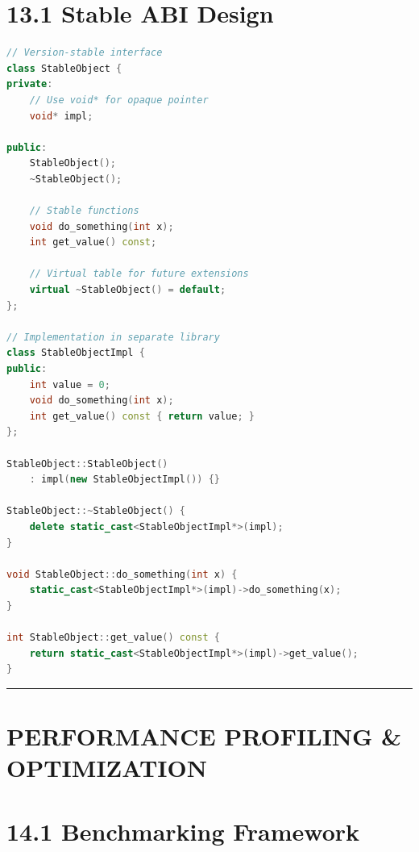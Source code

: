 \hypertarget{stable-abi-design}{%
\section{13.1 Stable ABI Design}\label{stable-abi-design}}

\begin{lstlisting}[language={C++}]
// Version-stable interface
class StableObject {
private:
    // Use void* for opaque pointer
    void* impl;
    
public:
    StableObject();
    ~StableObject();
    
    // Stable functions
    void do_something(int x);
    int get_value() const;
    
    // Virtual table for future extensions
    virtual ~StableObject() = default;
};

// Implementation in separate library
class StableObjectImpl {
public:
    int value = 0;
    void do_something(int x);
    int get_value() const { return value; }
};

StableObject::StableObject() 
    : impl(new StableObjectImpl()) {}

StableObject::~StableObject() {
    delete static_cast<StableObjectImpl*>(impl);
}

void StableObject::do_something(int x) {
    static_cast<StableObjectImpl*>(impl)->do_something(x);
}

int StableObject::get_value() const {
    return static_cast<StableObjectImpl*>(impl)->get_value();
}
\end{lstlisting}

\begin{center}\rule{0.5\linewidth}{0.5pt}\end{center}

\hypertarget{performance-profiling-optimization}{%
\section{PERFORMANCE PROFILING \&
OPTIMIZATION}\label{performance-profiling-optimization}}

\hypertarget{benchmarking-framework}{%
\section{14.1 Benchmarking Framework}\label{benchmarking-framework}}

